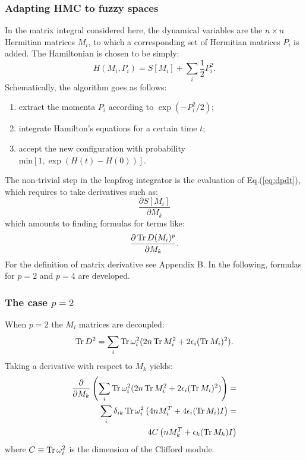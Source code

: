 \subsubsection{Adapting HMC to fuzzy spaces}
In the matrix integral considered here, the dynamical variables are the $n \times n$ Hermitian matrices $M_i$, to which a corresponding set of Hermitian matrices $P_i$ is added. The Hamiltonian is chosen to be simply:
\begin{equation} \label{eq:hamilt}
H(M_i, P_i) = S[M_i] + \sum_i \frac{1}{2}P_i^2.
\end{equation}
Schematically, the algorithm goes as follows:
\begin{enumerate}
\item extract the momenta $P_i$ according to $\exp(-P_i^2 / 2)$;
\item integrate Hamilton's equations for a certain time $t$;
\item accept the new configuration with probability $\text{min}[1, \exp (H(t)-H(0))]$.
\end{enumerate}
The non-trivial step in the leapfrog integrator is the evaluation of Eq.(\ref{eq:dpdt}), which requires to take derivatives such as:
\begin{equation}
\frac{\partial S[M_i]}{\partial M_k}
\end{equation}
which amounts to finding formulas for terms like:
\begin{equation}
\frac{\partial \operatorname{Tr} D(M_i)^p}{\partial M_k}.
\end{equation}
For the definition of matrix derivative see Appendix B. In the following, formulas for $p=2$ and $p=4$ are developed.

\subsubsection{The case $p=2$}
When $p = 2$ the $M_i$ matrices are decoupled:
\begin{equation}
\operatorname{Tr} D^2 = \sum_i \operatorname{Tr} \omega_i^2 (2 n \operatorname{Tr} M_i^2 + 2 \epsilon_i (\operatorname{Tr} M_i)^2).
\end{equation} 
Taking a derivative with respect to $M_k$ yields:
\begin{align}\label{eq:As}
\frac{\partial}{\partial M_k} \left( \sum_i \operatorname{Tr} \omega_i^2 (2 n \operatorname{Tr} M_i^2 + 2 \epsilon_i (\operatorname{Tr} M_i)^2) \right) = \notag \\
\sum_i \delta_{ik} \operatorname{Tr} \omega_i^2 \left( 4 n M_i^T + 4 \epsilon_i (\operatorname{Tr} M_i) I \right) = \notag \\
4 C \left( n M_k^T + \epsilon_k (\operatorname{Tr} M_k) I \right)
\end{align}
where $C \equiv \operatorname{Tr} \omega_i^2$ is the dimension of the Clifford module.

